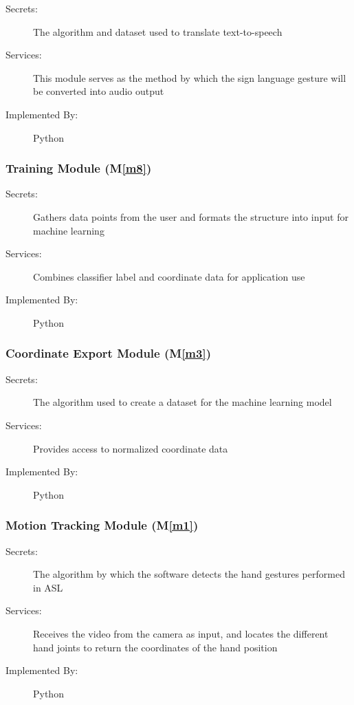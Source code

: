 \documentclass[12pt, titlepage]{article}
\newcommand{\mref}[1]{M\ref{#1}}
\begin{document}
\begin{description}
  \item[Secrets:] The algorithm and dataset used to translate text-to-speech
  \item[Services:] This module serves as the method by which the sign language gesture will be converted into audio output
  \item[Implemented By:] Python
  \end{description}  
  
\subsubsection{Training Module (\mref{m8})}

\begin{description}
  \item[Secrets:] Gathers data points from the user and formats the structure into input for machine learning
  \item[Services:] Combines classifier label and coordinate data for application use
  \item[Implemented By:] Python
  \end{description}
  


\subsubsection{Coordinate Export Module (\mref{m3})}
\begin{description}
  \item[Secrets:] The algorithm used to create a dataset for the machine learning model
  \item[Services:] Provides access to normalized coordinate data
  \item[Implemented By:] Python
  \end{description}
  


\subsubsection{Motion Tracking Module (\mref{m1})}

\begin{description}
  \item[Secrets:] The algorithm by which the software detects the hand gestures performed in ASL
  \item[Services:] Receives the video from the camera as input, and locates the different hand joints to return the coordinates of the hand position
  \item[Implemented By:] Python
  \end{description}
  
\end{document}
